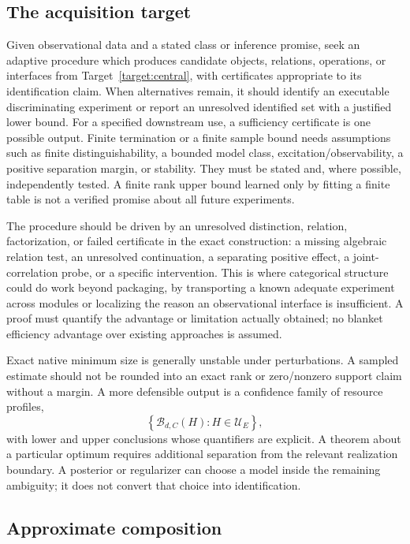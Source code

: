 \documentclass[11pt]{article}
\theoremstyle{remark}
\newcommand{\calU}{\mathcal U}
\begin{document}
\subsection{The acquisition target}

Given observational data and a stated class or inference promise, seek an adaptive procedure which produces candidate objects, relations, operations, or interfaces from Target~\ref{target:central}, with certificates appropriate to its identification claim. When alternatives remain, it should identify an executable discriminating experiment or report an unresolved identified set with a justified lower bound. For a specified downstream use, a sufficiency certificate is one possible output. Finite termination or a finite sample bound needs assumptions such as finite distinguishability, a bounded model class, excitation/observability, a positive separation margin, or stability. They must be stated and, where possible, independently tested. A finite rank upper bound learned only by fitting a finite table is not a verified promise about all future experiments.

The procedure should be driven by an unresolved distinction, relation, factorization, or failed certificate in the exact construction: a missing algebraic relation test, an unresolved continuation, a separating positive effect, a joint-correlation probe, or a specific intervention. This is where categorical structure could do work beyond packaging, by transporting a known adequate experiment across modules or localizing the reason an observational interface is insufficient. A proof must quantify the advantage or limitation actually obtained; no blanket efficiency advantage over existing approaches is assumed.

Exact native minimum size is generally unstable under perturbations. A sampled estimate should not be rounded into an exact rank or zero/nonzero support claim without a margin. A more defensible output is a confidence family of resource profiles,
\[
 \left\{\mathscr B_{d,C}(H):H\in\calU_E\right\},
\]
with lower and upper conclusions whose quantifiers are explicit. A theorem about a particular optimum requires additional separation from the relevant realization boundary. A posterior or regularizer can choose a model inside the remaining ambiguity; it does not convert that choice into identification.

\subsection{Approximate composition}
\end{document}
